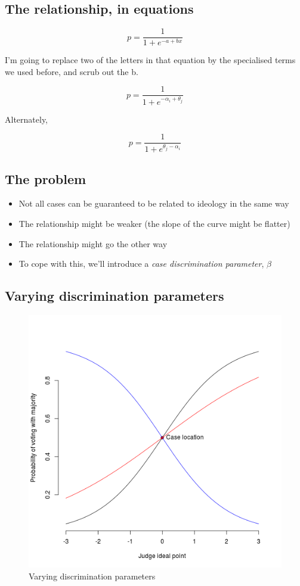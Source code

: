 \documentclass[12pt,twoside]{article}
\providecommand{\tightlist}{%
  \setlength{\itemsep}{0pt}\setlength{\parskip}{0pt}}
\begin{document}
\subsection{The relationship, in
equations}\label{the-relationship-in-equations}

\[
p = \frac{1}{1 + e^{-a + bx}}
\]

I'm going to replace two of the letters in that equation by the
specialised terms we used before, and scrub out the b.

\[
p = \frac{1}{1 + e^{-\alpha_i + \theta_j}}
\]

Alternately,

\[
p = \frac{1}{1 + e^{\theta_j-\alpha_i}}
\]

\subsection{The problem}\label{the-problem}

\begin{itemize}
\tightlist
\item
  Not all cases can be guaranteed to be related to ideology in the same
  way
\item
  The relationship might be weaker (the slope of the curve might be
  flatter)
\item
  The relationship might go the other way
\item
  To cope with this, we'll introduce a \emph{case discrimination
  parameter}, \(\beta\)
\end{itemize}

\subsection{Varying discrimination
parameters}\label{varying-discrimination-parameters}

\begin{figure}[htbp]
\centering
\includegraphics{figure/casediscrim-1.png}
\caption{Varying discrimination parameters}
\end{figure}
\end{document}
